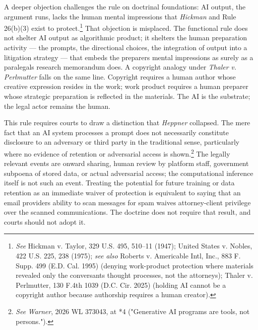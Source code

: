 \documentclass[
  12pt,
]{article}
\begin{document}
A deeper objection challenges the rule on doctrinal foundations: AI
output, the argument runs, lacks the human mental impressions that
\emph{Hickman} and Rule 26(b)(3) exist to protect.\footnote{\emph{See}
  Hickman v. Taylor, 329 U.S. 495, 510--11 (1947); United States v.
  Nobles, 422 U.S. 225, 238 (1975); \emph{see also} Roberts v.
  Americable Int\textquotesingle l, Inc., 883 F. Supp. 499 (E.D. Cal.
  1995) (denying work-product protection where materials revealed only
  the conversants\textquotesingle{} thought processes, not the
  attorney\textquotesingle s); Thaler v. Perlmutter, 130 F.4th 1039
  (D.C. Cir. 2025) (holding AI cannot be a copyright author because
  authorship requires a human creator).} That objection is misplaced.
The functional rule does not shelter AI output as algorithmic product;
it shelters the human preparation activity --- the prompts, the
directional choices, the integration of output into a litigation
strategy --- that embeds the preparer\textquotesingle s mental
impressions as surely as a paralegal\textquotesingle s research
memorandum does. A copyright analogy under \emph{Thaler v. Perlmutter}
falls on the same line. Copyright requires a human author whose creative
expression resides in the work; work product requires a human preparer
whose strategic preparation is reflected in the materials. The AI is the
substrate; the legal actor remains the human.

This rule requires courts to draw a distinction that \emph{Heppner}
collapsed. The mere fact that an AI system processes a prompt does not
necessarily constitute disclosure to an adversary or third party in the
traditional sense, particularly where no evidence of retention or
adversarial access is shown.\footnote{\emph{See} \emph{Warner}, 2026 WL
  373043, at *4 ("Generative AI programs are tools, not persons.").} The
legally relevant events are onward sharing, human review by platform
staff, government subpoena of stored data, or actual adversarial access;
the computational inference itself is not such an event. Treating the
potential for future training or data retention as an immediate waiver
of protection is equivalent to saying that an email
provider\textquotesingle s ability to scan messages for spam waives
attorney-client privilege over the scanned communications. The doctrine
does not require that result, and courts should not adopt it.
\end{document}
